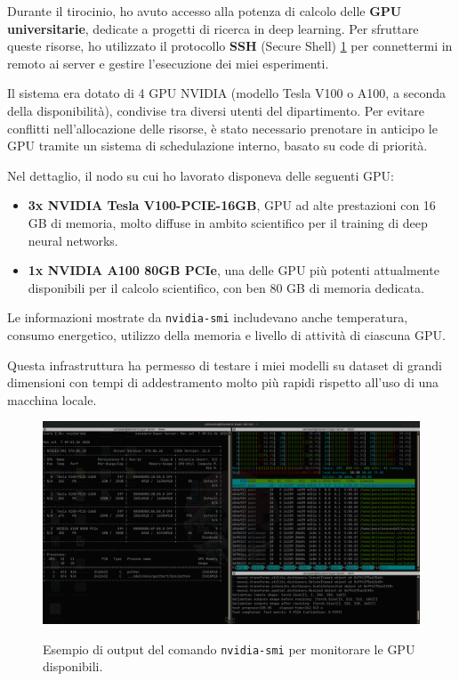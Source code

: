 
Durante il tirocinio, ho avuto accesso alla potenza di calcolo delle \textbf{GPU universitarie}, dedicate a progetti di ricerca in deep learning. Per sfruttare queste risorse, ho utilizzato il protocollo \textbf{SSH} (Secure Shell) \ref{fig:gpu_info} per connettermi in remoto ai server e gestire l’esecuzione dei miei esperimenti.

Il sistema era dotato di 4 GPU NVIDIA (modello Tesla V100 o A100, a seconda della disponibilità), condivise tra diversi utenti del dipartimento. Per evitare conflitti nell’allocazione delle risorse, è stato necessario prenotare in anticipo le GPU tramite un sistema di schedulazione interno, basato su code di priorità.

Nel dettaglio, il nodo su cui ho lavorato disponeva delle seguenti GPU:
\begin{itemize}
\item \textbf{3x NVIDIA Tesla V100-PCIE-16GB}, GPU ad alte prestazioni con 16 GB di memoria, molto diffuse in ambito scientifico per il training di deep neural networks.
\item \textbf{1x NVIDIA A100 80GB PCIe}, una delle GPU più potenti attualmente disponibili per il calcolo scientifico, con ben 80 GB di memoria dedicata. 
\end{itemize}

Le informazioni mostrate da \texttt{nvidia-smi} includevano anche temperatura, consumo energetico, utilizzo della memoria e livello di attività di ciascuna GPU. 

Questa infrastruttura ha permesso di testare i miei modelli su dataset di grandi dimensioni con tempi di addestramento molto più rapidi rispetto all’uso di una macchina locale.

\begin{figure}[H] 
  	\centering 
 	\includegraphics[width=\textwidth]{images/2025-07-07-09-52-55.png} 
	\label{fig:gpu_info}
	\caption{Esempio di output del comando \texttt{nvidia-smi} per monitorare le GPU disponibili.}
 \end{figure} 